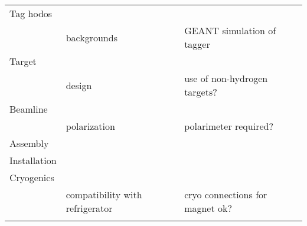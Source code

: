 \documentclass[12pt,dvips]{article}
\begin{document}
\begin{table}[htb]
\begin{center}
\begin{tabular}{|l|l|l|}
Tag hodos   &         &                           \\
            & backgrounds & GEANT simulation of tagger \\ \hline
Target      &         &                           \\ 
            & design & use of non-hydrogen targets? \\ \hline
Beamline    &         &                           \\
            & polarization & polarimeter required? \\ \hline
Assembly    &         &                           \\ \hline
Installation &         &                           \\ \hline
Cryogenics  &         &                           \\
            & compatibility with refrigerator & cryo connections for magnet ok? \\
            &  &  \\

\hline \hline
\end{tabular}
\label{tab:thscat}
\end{center}
\end{table} 
\end{document}
